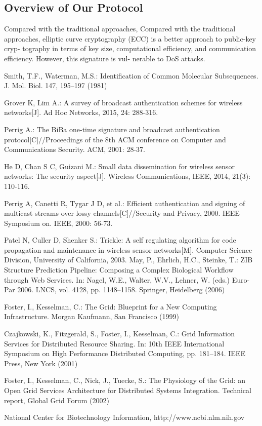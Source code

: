 \documentclass[lnicst,sechang,a4paper]{svmultln}
\begin{document}
\subsection{Overview of Our Protocol}
Compared with the traditional approaches, 
Compared with the traditional approaches, elliptic curve
cryptography (ECC) is a better approach to public-key cryp-
tography in terms of key size, computational efficiency, and
communication efficiency. However, this signature is vul-
nerable to DoS attacks.
\begin{thebibliography}{5}

 Smith, T.F., Waterman, M.S.: Identification of Common Molecular
Subsequences. J. Mol. Biol. 147, 195--197 (1981)

 Grover K, Lim A.: A survey of broadcast authentication schemes for wireless networks[J]. Ad Hoc Networks, 2015, 24: 288-316.

 Perrig A.: The BiBa one-time signature and broadcast authentication protocol[C]//Proceedings of the 8th ACM conference on Computer and Communications Security. ACM, 2001: 28-37.

 He D, Chan S C, Guizani M.: Small data dissemination for wireless sensor networks: The security aspect[J]. Wireless Communications, IEEE, 2014, 21(3): 110-116.

 Perrig A, Canetti R, Tygar J D, et al.: Efficient authentication and signing of multicast streams over lossy channels[C]//Security and Privacy, 2000. IEEE Symposium on. IEEE, 2000: 56-73.%

Patel N, Culler D, Shenker S.: Trickle: A self regulating algorithm for code propagation and maintenance in wireless sensor networks[M]. Computer Science Division, University of California, 2003.
 May, P., Ehrlich, H.C., Steinke, T.: ZIB Structure Prediction Pipeline:
Composing a Complex Biological Workflow through Web Services. In: Nagel,
W.E., Walter, W.V., Lehner, W. (eds.) Euro-Par 2006. LNCS, vol. 4128,
pp. 1148--1158. Springer, Heidelberg (2006)

 Foster, I., Kesselman, C.: The Grid: Blueprint for a New Computing
Infrastructure. Morgan Kaufmann, San Francisco (1999)

 Czajkowski, K., Fitzgerald, S., Foster, I., Kesselman, C.: Grid
Information Services for Distributed Resource Sharing. In: 10th IEEE
International Symposium on High Performance Distributed Computing, pp.
181--184. IEEE Press, New York (2001)

 Foster, I., Kesselman, C., Nick, J., Tuecke, S.: The Physiology of the
Grid: an Open Grid Services Architecture for Distributed Systems
Integration. Technical report, Global Grid Forum (2002)

 National Center for Biotechnology Information, http://www.ncbi.nlm.nih.gov

\end{thebibliography}
\end{document}

